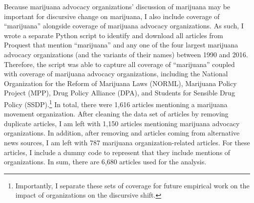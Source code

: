 Because marijuana advocacy organizations' discussion of marijuana may be important for discursive change on marijuana, I also include coverage of ``marijuana'' alongside coverage of marijuana advocacy organizations. As such, I wrote a separate Python script to identify and download all articles from Proquest that mention ``marijuana'' and any one of the four largest marijuana advocacy organizations (and the variants of their names) between 1990 and 2016. Therefore, the script was able to capture all coverage of ``marijuana'' coupled with coverage of marijuana advocacy organizations, including the National Organization for the Reform of Marijuana Laws (NORML), Marijuana Policy Project (MPP), Drug Policy Alliance (DPA), and Students for Sensible Drug Policy (SSDP).\footnote{Importantly, I separate these sets of coverage for future empirical work on the impact of organizations on the discursive shift.} In total, there were 1,616 articles mentioning a marijuana movement organization. After cleaning the data set of articles by removing duplicate articles, I am left with 1,150 articles mentioning marijuana advocacy organizations. In addition, after removing and articles coming from alternative news sources, I am left with 787 marijuana organization-related articles. For these articles, I include a dummy code to represent that they include mentions of organizations. In sum, there are 6,680 articles used for the analysis. 



